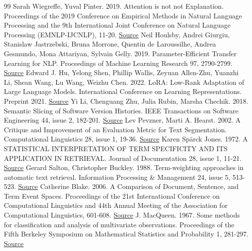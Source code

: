\documentclass[10pt,letterpaper]{article}
\begin{document}
\begin{thebibliography}{99}
Sarah Wiegreffe, Yuval Pinter. 2019. Attention is not not Explanation. Proceedings of the 2019 Conference on Empirical Methods in Natural Language Processing and the 9th International Joint Conference on Natural Language Processing (EMNLP-IJCNLP), 11-20. \href{https://aclanthology.org/D19-1002/}{Source}
Neil Houlsby, Andrei Giurgiu, Stanislaw Jastrzebski, Bruna Morrone, Quentin de Laroussilhe, Andrea Gesmundo, Mona Attariyan, Sylvain Gelly. 2019. Parameter-Efficient Transfer Learning for NLP. Proceedings of Machine Learning Research 97, 2790-2799. \href{https://proceedings.mlr.press/v97/houlsby19a.html}{Source}
Edward J. Hu, Yelong Shen, Phillip Wallis, Zeyuan Allen-Zhu, Yuanzhi Li, Shean Wang, Lu Wang, Weizhu Chen. 2022. LoRA: Low-Rank Adaptation of Large Language Models. International Conference on Learning Representations. Preprint 2021. \href{https://arxiv.org/abs/2106.09685}{Source}
Yi Li, Chenguang Zhu, Julia Rubin, Marsha Chechik. 2018. Semantic Slicing of Software Version Histories. IEEE Transactions on Software Engineering 44, issue 2, 182-201. \href{https://doi.org/10.1109/TSE.2017.2664824}{Source}
Lev Pevzner, Marti A. Hearst. 2002. A Critique and Improvement of an Evaluation Metric for Text Segmentation. Computational Linguistics 28, issue 1, 19-36. \href{https://aclanthology.org/J02-1002/}{Source}
Karen Spärck Jones. 1972. A STATISTICAL INTERPRETATION OF TERM SPECIFICITY AND ITS APPLICATION IN RETRIEVAL. Journal of Documentation 28, issue 1, 11-21. \href{https://doi.org/10.1108/eb026526}{Source}
Gerard Salton, Christopher Buckley. 1988. Term-weighting approaches in automatic text retrieval. Information Processing \& Management 24, issue 5, 513-523. \href{https://doi.org/10.1016/0306-4573%2888%2990021-0}{Source}
Catherine Blake. 2006. A Comparison of Document, Sentence, and Term Event Spaces. Proceedings of the 21st International Conference on Computational Linguistics and 44th Annual Meeting of the Association for Computational Linguistics, 601-608. \href{https://aclanthology.org/P06-1076/}{Source}
J. MacQueen. 1967. Some methods for classification and analysis of multivariate observations. Proceedings of the Fifth Berkeley Symposium on Mathematical Statistics and Probability 1, 281-297. \href{https://projecteuclid.org/ebooks/berkeley-symposium-on-mathematical-statistics-and-probability/Proceedings-of-the-Fifth-Berkeley-Symposium-on-Mathematical-Statistics-and/chapter/Some-methods-for-classification-and-analysis-of-multivariate-observations/bsmsp/1200512992}{Source}

\end{thebibliography}
\end{document}
